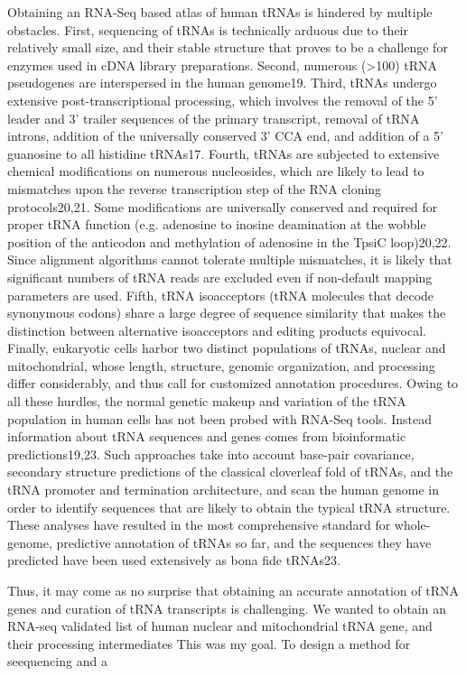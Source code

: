 \documentclass[12pt]{rockefeller}
\begin{document}
Obtaining an RNA-Seq based atlas of human tRNAs is hindered by multiple obstacles. First, sequencing of tRNAs is technically arduous due to their relatively small size, and their stable structure that proves to be a challenge for enzymes used in cDNA library preparations. Second, numerous (>100) tRNA pseudogenes are interspersed in the human genome19. Third, tRNAs undergo extensive post-transcriptional processing, which involves the removal of the 5’ leader and 3’ trailer sequences of the primary transcript, removal of tRNA introns, addition of the universally conserved 3’ CCA end, and addition of a 5’ guanosine to all histidine tRNAs17. Fourth, tRNAs are subjected to extensive chemical modifications on numerous nucleosides, which are likely to lead to mismatches upon the reverse transcription step of the RNA cloning protocols20,21. Some modifications are universally conserved and required for proper tRNA function (e.g. adenosine to inosine deamination at the wobble position of the anticodon and methylation of adenosine in the TpsiC loop)20,22. Since alignment algorithms cannot tolerate multiple mismatches, it is likely that significant numbers of tRNA reads are excluded even if non-default mapping parameters are used. Fifth, tRNA isoacceptors (tRNA molecules that decode synonymous codons) share a large degree of sequence similarity that makes the distinction between alternative isoacceptors and editing products equivocal. Finally, eukaryotic cells harbor two distinct populations of tRNAs, nuclear and mitochondrial, whose length, structure, genomic organization, and processing differ considerably, and thus call for customized annotation procedures. 	Owing to all these hurdles, the normal genetic makeup and variation of the tRNA population in human cells has not been probed with RNA-Seq tools. Instead information about tRNA sequences and genes comes from bioinformatic predictions19,23. Such approaches take into account base-pair covariance, secondary structure predictions of the classical cloverleaf fold of tRNAs, and the tRNA promoter and termination architecture, and scan the human genome in order to identify sequences that are likely to obtain the typical tRNA structure. These analyses have resulted in the most comprehensive standard for whole-genome, predictive annotation of tRNAs so far, and the sequences they have predicted have been used extensively as bona fide tRNAs23.

Thus, it may come as no surprise that obtaining an accurate annotation of tRNA genes and curation of tRNA transcripts is challenging. 
We wanted to obtain an RNA-seq validated list of human nuclear and mitochondrial tRNA gene, and their processing intermediates
This was my goal. To design a method for seequencing and a 
\end{document}
